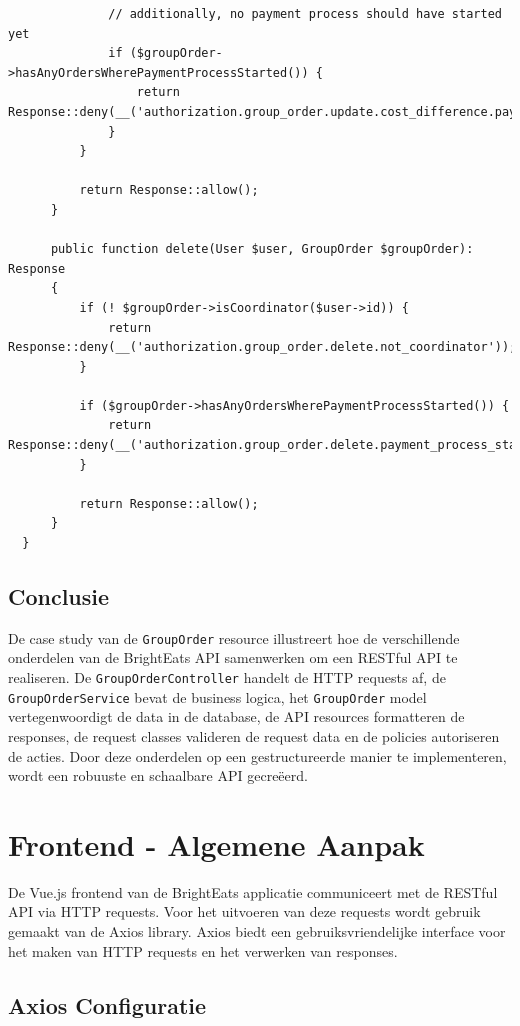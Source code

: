 \begin{verbatim}
              // additionally, no payment process should have started yet
              if ($groupOrder->hasAnyOrdersWherePaymentProcessStarted()) {
                  return Response::deny(__('authorization.group_order.update.cost_difference.payment_process_started'));
              }
          }
  
          return Response::allow();
      }
  
      public function delete(User $user, GroupOrder $groupOrder): Response
      {
          if (! $groupOrder->isCoordinator($user->id)) {
              return Response::deny(__('authorization.group_order.delete.not_coordinator'));
          }
  
          if ($groupOrder->hasAnyOrdersWherePaymentProcessStarted()) {
              return Response::deny(__('authorization.group_order.delete.payment_process_started'));
          }
  
          return Response::allow();
      }
  }
\end{verbatim}
\label{lst:grouporderpolicy}

\subsection{Conclusie}

De case study van de \texttt{GroupOrder} resource illustreert hoe de verschillende onderdelen van de BrightEats API samenwerken om een RESTful API te realiseren. De \texttt{GroupOrderController} handelt de HTTP requests af, de \texttt{GroupOrderService} bevat de business logica, het \texttt{GroupOrder} model vertegenwoordigt de data in de database, de API resources formatteren de responses, de request classes valideren de request data en de policies autoriseren de acties. Door deze onderdelen op een gestructureerde manier te implementeren, wordt een robuuste en schaalbare API gecreëerd.

\section{Frontend - Algemene Aanpak}

De Vue.js frontend van de BrightEats applicatie communiceert met de RESTful API via HTTP requests. Voor het uitvoeren van deze requests wordt gebruik gemaakt van de Axios library. Axios biedt een gebruiksvriendelijke interface voor het maken van HTTP requests en het verwerken van responses.

\subsection{Axios Configuratie}

